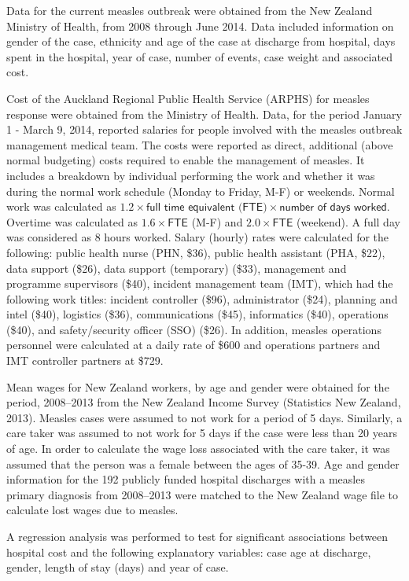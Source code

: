 \documentclass{article}
\begin{document}
Data for the current measles outbreak were obtained from the New Zealand Ministry of Health, from 2008 through June 2014. Data included information on gender of the case, ethnicity and age of the case at discharge from hospital, days spent in the hospital, year of case, number of events, case weight and associated cost.

Cost of the Auckland Regional Public Health Service (ARPHS) for measles response were obtained from the Ministry of Health. Data, for the period January 1 - March 9, 2014, reported salaries for people involved with the measles outbreak management medical team. The costs were reported as direct, additional (above normal budgeting) costs required to enable the management of measles. It includes a breakdown by individual performing the work and whether it was during the normal work schedule (Monday to Friday, M-F) or weekends. Normal work was calculated as $1.2 \times \textsf{full time equivalent (FTE)} \times \textsf{number of days worked}$. Overtime was calculated as $1.6\times\textsf{FTE}$ (M-F) and $2.0 \times \textsf{FTE}$ (weekend). A full day was considered as 8 hours worked. Salary (hourly) rates were calculated for the following: public health nurse (PHN, \$36), public health assistant (PHA, \$22), data support (\$26), data support (temporary) (\$33), management and programme supervisors (\$40), incident management team (IMT), which had the following work titles: incident controller (\$96), administrator (\$24), planning and intel (\$40), logistics (\$36), communications (\$45), informatics (\$40), operations (\$40), and safety/security officer (SSO) (\$26). In addition, measles operations personnel were calculated at a daily rate of \$600 and operations partners and IMT controller partners at \$729.

Mean wages for New Zealand workers, by age and gender were obtained for the period, 2008--2013 from the New Zealand Income Survey (Statistics New Zealand, 2013). Measles cases were assumed to not work for a period of 5 days. Similarly, a care taker was assumed to not work for 5 days if the case were less than 20 years of age. In order to calculate the wage loss associated with the care taker, it was assumed that the person was a female between the ages of 35-39. Age and gender information for the 192 publicly funded hospital discharges with a measles primary diagnosis from 2008--2013 were matched to the New Zealand wage file to calculate lost wages due to measles.

A regression analysis was performed to test for significant associations between hospital cost and the following explanatory variables: case age at discharge, gender, length of stay (days) and year of case.
\end{document}
